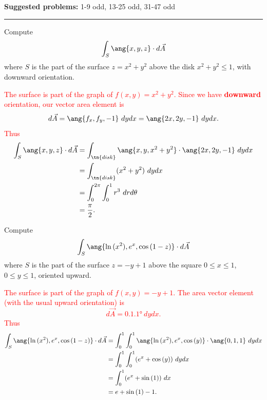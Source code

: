 \documentclass[12pt,reqno]{amsart}
\begin{document}
\textbf{Suggested problems:} 1-9 odd, 13-25 odd, 31-47 odd

\bigskip
\hrule

\bigskip

\prob Compute
	\[\int_S \ang{x,y,z} \cdot d \vec{A}
	\]
where $S$ is the part of the surface $z=x^2+y^2$ above the disk $x^2+y^2 \leq 1$, with downward orientation.

\bigskip
\textcolor{red}{The surface is part of the graph of $f(x,y) = x^2+y^2$. Since we have \textbf{downward} orientation, our vector area element is
	\[d\vec{A} = \ang{f_x,f_y,-1} \ dy dx = \ang{2x,2y,-1} \ dydx.
	\]
Thus
\begin{align*}
\int_S \ang{x,y,z} \cdot d \vec{A} &= \int_\tn{disk} \ang{x,y,x^2+y^2} \cdot \ang{2x,2y,-1} \ dy dx \\
&= \int_\tn{disk} (x^2+y^2) \ dydx \\
&= \int_0^{2\pi} \int_0^1 r^3 \ dr d\theta \\
&= \frac{\pi}{2}.
\end{align*}}
\bigskip

\prob Compute
	\[\int_S \ang{\ln{(x^2)}, e^x, \cos{(1-z)}} \cdot d\vec{A}
	\]
where $S$ is the part of the surface $z=-y+1$ above the square $0 \leq x\leq 1$, $0\leq y \leq 1$, oriented upward.

\bigskip
\textcolor{red}{The surface is part of the graph of $f(x,y) = -y+1$. The area vector element (with the usual upward orientation) is
	\[d\vec{A} = \ang{0,1,1} \ dy dx.
	\]
Thus
\begin{align*}
\int_S \ang{\ln{(x^2)}, e^x, \cos{(1-z)}} \cdot d\vec{A} &= \int_0^1 \int_0^1 \ang{\ln{(x^2)} , e^x, \cos{(y)}} \cdot \ang{0,1,1} \ dydx \\
&= \int_0^1 \int_0^1 (e^x + \cos{(y)}) \ dy dx \\
&= \int_0^1 ( e^x + \sin{(1)}) \ dx \\
&= e+\sin{(1)}-1.
\end{align*}}
\end{document}
